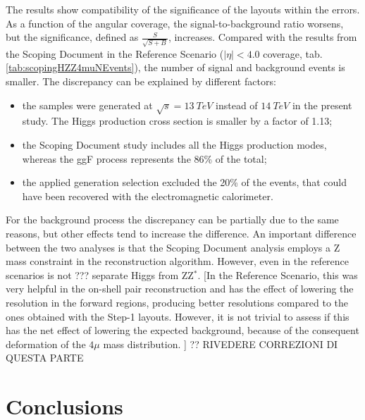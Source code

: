 \documentclass[a4paper,twoside,12pt]{article}
\begin{document}
The results show compatibility of the significance of the layouts within the errors. As a function of the angular coverage, the 
signal-to-background ratio worsens, but the significance, defined as $\frac{S}{\sqrt{S+B}}$, increases. 
Compared with the results from the Scoping Document in the Reference Scenario 
($|\eta| < 4.0$ coverage, tab.\ref{tab:scopingHZZ4muNEvents}), the number of
signal and background events is smaller. The discrepancy can be explained by 
different factors:\\
\begin{itemize}
\item the samples were generated at $\sqrt{s} = 13\ TeV$ instead of $14\ TeV$ in the present study. The Higgs
production cross section is smaller by a factor of 1.13; 
\item the Scoping Document study includes all the Higgs production modes, whereas the ggF process represents the 86\% of 
the total;
\item the applied generation selection excluded the 20\% of the events, that could have been recovered with
	the electromagnetic calorimeter.
\end{itemize} 

For the background process the discrepancy can be partially due to the same reasons, but other effects tend to increase the difference. 
An important difference between the two analyses is that the Scoping Document analysis employs a Z mass constraint
in the reconstruction algorithm. However, even in the reference scenarios is not ??? separate Higgs from ZZ$^{*}$. [In the Reference Scenario, this was very helpful in the on-shell pair reconstruction and
has the effect of lowering the resolution in the forward regions, producing better resolutions compared to the
ones obtained with the Step-1 layouts. However, it is not trivial to assess if this has the net effect of lowering the expected
background, because of the consequent deformation of the $4\mu$ mass distribution. ] ?? RIVEDERE CORREZIONI DI QUESTA PARTE

\clearpage
\section{Conclusions}\label{sec:conclusions}
\clearpage
\end{document}
